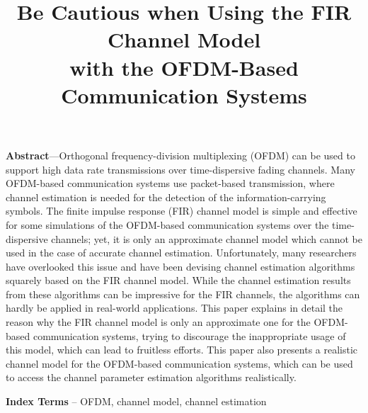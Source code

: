 \documentclass[11pt,draftnofoot,onecolumn]{IEEEtran}
\def\spacingset#1{\def\baselinestretch{#1}\small\normalsize}
\begin{document}
\spacingset{1.5}

\title{Be Cautious when Using the FIR Channel Model\\
with the OFDM-Based Communication Systems}

%
\author{
%
}
%
%
\maketitle%
%



{\bf Abstract}---Orthogonal frequency-division multiplexing (OFDM) 
can be used
to support high data rate transmissions over time-dispersive fading
channels. Many OFDM-based communication systems use packet-based
transmission, where channel estimation is needed for the detection
of the information-carrying symbols. The finite impulse response
(FIR) channel model is simple and effective for some simulations of
the OFDM-based communication systems over the time-dispersive
channels; yet, it is only an approximate channel model which cannot
be used in the case of accurate channel estimation. Unfortunately,
many researchers have overlooked this issue and have been devising
channel estimation algorithms squarely based on the FIR channel
model. While the channel estimation results from these algorithms
can be impressive for the FIR channels, the algorithms can hardly be
applied in real-world applications. This paper explains in detail
the reason why the FIR channel model is only an approximate one for
the OFDM-based communication systems, 
trying to discourage the inappropriate usage
of this model, which can lead to fruitless efforts. This paper also
presents a realistic channel model for the OFDM-based communication
systems, which can be used to access the channel parameter
estimation algorithms
realistically.%

\vspace{0.2cm}

{\bf Index Terms} -- OFDM, channel model, channel estimation

\vspace{1.2cm}
\end{document}
